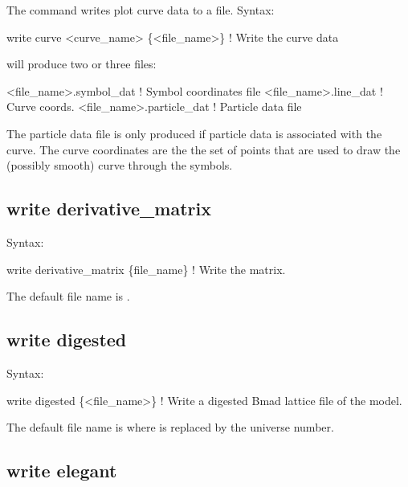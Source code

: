 {{{{{{{{{{{The  command writes plot curve data to a file.
Syntax:
\begin{example}
    write curve <curve_name> \{<file_name>\} ! Write the curve data
\end{example}

 will produce two or three files:
\begin{example}
  <file_name>.symbol_dat    ! Symbol coordinates file
  <file_name>.line_dat      ! Curve coords.
  <file_name>.particle_dat  ! Particle data file
\end{example}
The particle data file is only produced if particle data is associated with the curve.  The curve
coordinates are the the set of points that are used to draw the (possibly smooth) curve through the
symbols.



\subsection{write derivative_matrix}
\label{s:write.deriv.matrix}

Syntax:
\begin{example}
    write derivative_matrix \{file_name\}    ! Write the  matrix.
\end{example}

The default file name is . 


\subsection{write digested}
\label{s:write.digested}

Syntax:
\begin{example}
    write digested \{<file_name>\}      ! Write a digested Bmad lattice file of the model.
\end{example}

The default file name is  where \vn{\#} is replaced by the universe number. 



\subsection{write elegant}
\label{s:write.elegant}

}}}}}}}}}}}
